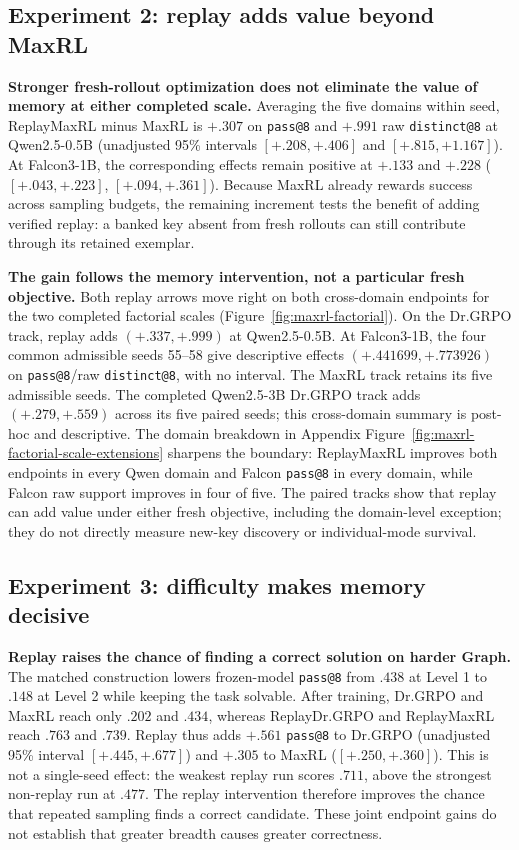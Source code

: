 \subsection{Experiment 2: replay adds value beyond MaxRL}
\label{app:results-maxrl}

\textbf{Stronger fresh-rollout optimization does not eliminate the value of
memory at either completed scale.} Averaging the five domains within seed,
ReplayMaxRL minus MaxRL is \(+.307\) on \texttt{pass@8} and \(+.991\) raw
\texttt{distinct@8} at Qwen2.5-0.5B (unadjusted 95\% intervals
\([+.208,+.406]\) and \([+.815,+1.167]\)). At Falcon3-1B, the corresponding
effects remain positive at \(+.133\) and \(+.228\)
(\([+.043,+.223]\), \([+.094,+.361]\)). Because MaxRL already rewards success
across sampling budgets, the remaining increment tests the benefit of adding
verified replay: a banked key absent from fresh rollouts can still contribute
through its retained exemplar.

\textbf{The gain follows the memory intervention, not a particular fresh
objective.} Both replay arrows move right on both cross-domain endpoints for
the two completed factorial scales (Figure~\ref{fig:maxrl-factorial}). On the Dr.GRPO track, replay
adds \((+.337,+.999)\) at Qwen2.5-0.5B. At Falcon3-1B, the four common
admissible seeds 55--58 give descriptive effects
\((+.441699,+.773926)\) on \texttt{pass@8}/raw \texttt{distinct@8}, with no
interval. The MaxRL track retains its five admissible seeds. The completed
Qwen2.5-3B Dr.GRPO track adds \((+.279,+.559)\) across its five paired seeds;
this cross-domain summary is post-hoc and descriptive. The domain breakdown in Appendix
Figure~\ref{fig:maxrl-factorial-scale-extensions} sharpens the boundary:
ReplayMaxRL improves both endpoints in every Qwen domain and Falcon
\texttt{pass@8} in every domain, while Falcon raw support improves in four of
five. The paired tracks show that replay can add value under either fresh
objective, including the domain-level exception; they do not directly measure
new-key discovery or individual-mode survival.

\subsection{Experiment 3: difficulty makes memory decisive}
\label{app:results-levels}

\textbf{Replay raises the chance of finding a correct solution on harder
Graph.} The matched construction lowers frozen-model \texttt{pass@8}
from \(.438\) at Level 1 to \(.148\) at Level 2 while keeping the task
solvable. After training, Dr.GRPO and MaxRL reach only \(.202\) and \(.434\),
whereas ReplayDr.GRPO and ReplayMaxRL reach \(.763\) and \(.739\). Replay thus
adds \(+.561\) \texttt{pass@8} to Dr.GRPO (unadjusted 95\% interval
\([+.445,+.677]\)) and \(+.305\) to MaxRL (\([+.250,+.360]\)). This is not a
single-seed effect: the weakest replay run scores \(.711\), above the strongest
non-replay run at \(.477\). The replay intervention therefore improves the
chance that repeated sampling finds a correct candidate. These joint endpoint
gains do not establish that greater breadth causes greater correctness.

